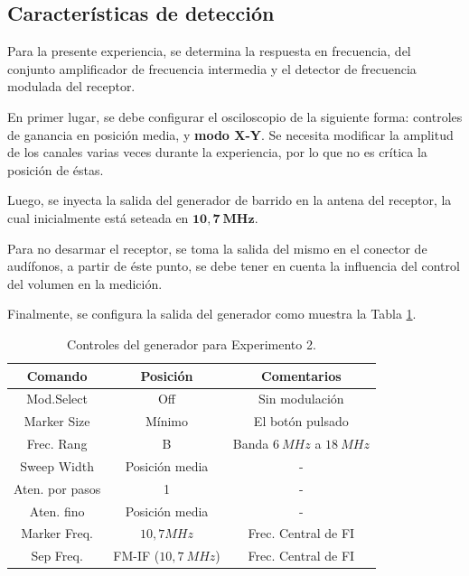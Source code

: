   \subsection{Características de detección}

  Para la presente experiencia, se determina la respuesta en frecuencia, del conjunto 
  amplificador de frecuencia intermedia y el detector de frecuencia modulada del 
  receptor.

  En primer lugar, se debe configurar el osciloscopio de la siguiente forma: 
  controles de ganancia en posición media, y \textbf{modo X-Y}. Se necesita modificar 
  la amplitud de los canales varias veces durante la experiencia, por lo que 
  no es crítica la posición de éstas.

  Luego, se inyecta la salida del generador de barrido en la 
  antena del receptor, la cual inicialmente está seteada en $\mathbf{10,7~MHz}$.

  Para no desarmar el receptor, se toma la salida del mismo en el conector 
  de audífonos, a partir de éste punto, se debe tener en cuenta la influencia 
  del control del volumen en la medición.

  Finalmente, se configura la salida del generador como muestra la Tabla 
  \ref{tab:ControlesGenExp2}.

  \begin{table}[H] 
    \centering 
    \begin{tabular}[H]{c c c}\hline
      \textbf{Comando} & \textbf{Posición} & \textbf{Comentarios} \\  \hline  
          Mod.Select    &       Off         &     Sin modulación  \\  \hline
          Marker Size   &       Mínimo      &   El botón pulsado  \\  \hline
          Frec. Rang    &      B            &  Banda $6~MHz$ a $18~MHz$ \\  \hline
          Sweep Width   &   Posición media  &       -             \\  \hline
          Aten. por pasos &       1         &       -             \\  \hline
          Aten. fino    &   Posición media  &       -             \\  \hline
          Marker Freq.  &   $10,7MHz$       & Frec. Central de  FI \\  \hline
          Sep Freq.     & FM-IF ($10,7~MHz$) & Frec. Central de  FI \\  \hline
    \end{tabular}
    \caption{Controles del generador para Experimento 2.}
    \label{tab:ControlesGenExp2}
  \end{table}

